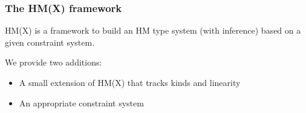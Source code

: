 \documentclass[xcolor=svgnames,11pt]{beamer}
\begin{document}
\begin{frame}
  \frametitle{The HM(X) framework}
  HM(X) \citep{DBLP:journals/tapos/OderskySW99} is a framework
  to build an HM type system (with inference) based on a given constraint system.

  We provide two additions:
  \begin{itemize}
  \item A small extension of HM(X) that tracks kinds and linearity
  \item An appropriate constraint system
  \end{itemize}
\end{frame}



\end{document}
